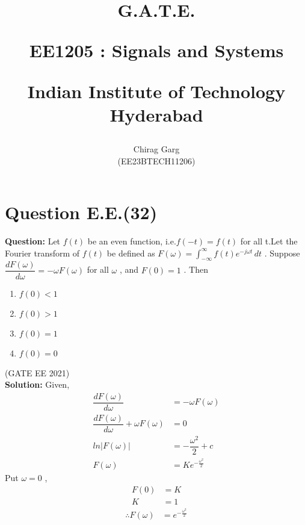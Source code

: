 \documentclass[journal,12pt,twocolumn]{IEEEtran}
\theoremstyle{remark}
\begin{document}
%






\title{
G.A.T.E.

\large{EE1205 : Signals and Systems}

Indian Institute of Technology Hyderabad
}
\author{Chirag Garg

(EE23BTECH11206)
}	





\maketitle

\newpage



\bigskip

\renewcommand{\thefigure}{\theenumi}
\renewcommand{\thetable}{\theenumi}


\section{Question E.E.(32)}
\vspace{0.5cm}



\textbf{Question:} 
Let $f(t)$ be an even function, i.e.$f(-t) = f(t)$ for all t.Let the Fourier transform of $f(t)$ be defined as $F(\omega) = \int_{-\infty}^{\infty} f(t) e^{-j \omega t} \, dt $ . Suppose $\dfrac{dF(\omega)}{d \omega} = -\omega F(\omega)$ for all $\omega$ , and $F(0) = 1$ . Then


\begin{enumerate}[label = (\Alph*)]
\item $f(0) < 1 $\\
\item  $f(0) > 1 $\\
\item  $f(0) = 1 $\\
\item   $f(0) = 0 $\\
\end{enumerate} \hfill{(GATE EE 2021)}\\
\textbf{Solution: }
Given, \begin{align}
\dfrac{dF(\omega)}{d \omega} &= -\omega F(\omega) \\
\dfrac{dF(\omega)}{d \omega} + \omega F(\omega) &= 0 \\
ln|F(\omega)| &= -\dfrac{\omega^{2}}{2} + c \\
F(\omega) &= Ke^{-\frac{\omega^2}{2}}
\end{align}
Put $\omega = 0$ , \begin{align}
F(0) &= K \\
K&=1
\end{align}
\begin{align}
\therefore F(\omega) &= e^{-\frac{\omega^2}{2}}
\end{align}
\end{document}
